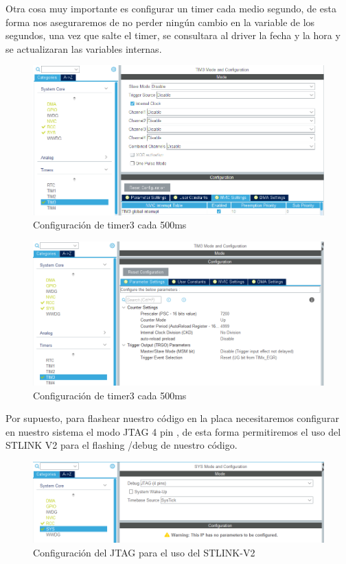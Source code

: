 \documentclass[10pt,a4paper,oneside]{article}
\begin{document}
Otra cosa muy importante es configurar un timer cada medio segundo, de esta forma nos aseguraremos de no perder ningún cambio en la variable de los segundos, una vez que salte el timer, se consultara al driver la fecha y la hora y se actualizaran las variables internas.

\begin{figure}[H]
\centering
\includegraphics[scale=0.5]{Imagenes/TIMER3_CFG1.png}
\caption[Configuración de timer3 cada 500ms]{Configuración de timer3 cada 500ms}
\label{fig:004}
\end{figure}

\begin{figure}[H]
\centering
\includegraphics[scale=0.5]{Imagenes/TIMER3_CFG2.png}
\caption[Configuración de timer3 cada 500ms]{Configuración de timer3 cada 500ms}
\label{fig:005}
\end{figure}

Por supuesto, para flashear nuestro código en la placa necesitaremos configurar en nuestro sistema el modo JTAG 4 pin , de esta forma permitiremos el uso del STLINK V2 para el flashing /debug de nuestro código.

\begin{figure}[H]
\centering
\includegraphics[scale=0.5]{Imagenes/JTAG_CFG.png}
\caption[Configuración del JTAG para el uso del STLINK-V2]{Configuración del JTAG para el uso del STLINK-V2}
\label{fig:006}
\end{figure}
\end{document}
